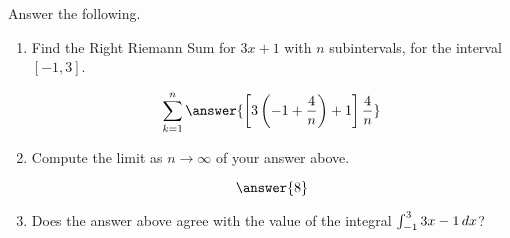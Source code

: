 \documentclass{ximera}
\author{Gregory Hartman \and Matthew Carr}
\begin{document}
\begin{exercise}


Answer the following.

\begin{enumerate}
\item Find the Right Riemann Sum for $3x+1$ with $n$ subintervals, for the interval $[-1,3]$.
\begin{prompt}
\[
\sum_{k=1}^n \answer{\left[3\left(-1+\frac{4}{n}\right)+1\right]\frac{4}{n}}
\]
\end{prompt}
\item Compute the limit as $n\to\infty$ of your answer above. \begin{prompt} \[\answer{8}\]
\end{prompt}
\item Does the answer above agree with the value of the integral
  $\int_{-1}^{3}3x-1\mathop{}\!d x$? \begin{multipleChoice}
   
\end{multipleChoice}
\end{enumerate}
\end{exercise}
\end{document}
